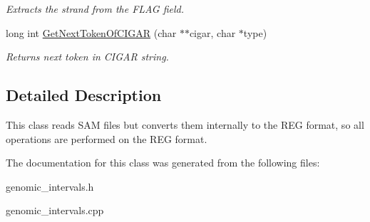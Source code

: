 \begin{CompactItemize}
\begin{CompactList}\small\item\em Extracts the strand from the FLAG field. \item\end{CompactList}\item 
\hypertarget{classGenomicRegionSAMToREG_dbc035818bcc64cc715b16c34b314799}{
long int \hyperlink{classGenomicRegionSAMToREG_dbc035818bcc64cc715b16c34b314799}{GetNextTokenOfCIGAR} (char $\ast$$\ast$cigar, char $\ast$type)}
\label{classGenomicRegionSAMToREG_dbc035818bcc64cc715b16c34b314799}

\begin{CompactList}\small\item\em Returns next token in CIGAR string. \item\end{CompactList}\end{CompactItemize}


\subsection{Detailed Description}
This class reads SAM files but converts them internally to the REG format, so all operations are performed on the REG format. 

The documentation for this class was generated from the following files:\begin{CompactItemize}
\item 
genomic\_\-intervals.h\item 
genomic\_\-intervals.cpp\end{CompactItemize}
